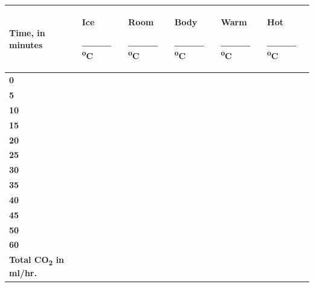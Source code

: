\documentclass[
  letterpaper,
  DIV=11,
  numbers=noendperiod]{scrreprt}
\newcounter{none} %
\begin{document}
{\def\LTcaptype{none} %
\begin{longtable}[]{@{}
  >{\centering\arraybackslash}p{}
  >{\raggedright\arraybackslash}p{}
  >{\raggedright\arraybackslash}p{}
  >{\raggedright\arraybackslash}p{}
  >{\raggedright\arraybackslash}p{}
  >{\raggedright\arraybackslash}p{}@{}}
\toprule\noalign{}
\begin{minipage}[b]{\linewidth}\centering
\textbf{Time, in minutes}
\end{minipage} & \begin{minipage}[b]{\linewidth}\raggedright
\textbf{Ice}

\textbf{\_\_\_\_ \textsuperscript{o}C}
\end{minipage} & \begin{minipage}[b]{\linewidth}\raggedright
\textbf{Room}

\textbf{\_\_\_\_ \textsuperscript{o}C}
\end{minipage} & \begin{minipage}[b]{\linewidth}\raggedright
\textbf{Body}

\textbf{\_\_\_\_ \textsuperscript{o}C}
\end{minipage} & \begin{minipage}[b]{\linewidth}\raggedright
\textbf{Warm}

\textbf{\_\_\_\_ \textsuperscript{o}C}
\end{minipage} & \begin{minipage}[b]{\linewidth}\raggedright
\textbf{Hot}

\textbf{\_\_\_\_ \textsuperscript{o}C}
\end{minipage} \\
\midrule\noalign{}
\endhead
\bottomrule\noalign{}
\endlastfoot
\textbf{0} & & & & & \\
\textbf{5} & & & & & \\
\textbf{10} & & & & & \\
\textbf{15} & & & & & \\
\textbf{20} & & & & & \\
\textbf{25} & & & & & \\
\textbf{30} & & & & & \\
\textbf{35} & & & & & \\
\textbf{40} & & & & & \\
\textbf{45} & & & & & \\
\textbf{50} & & & & & \\
\textbf{60} & & & & & \\
\textbf{Total CO\textsubscript{2} in ml/hr.} & & & & & \\
\end{longtable}
}
\end{document}
